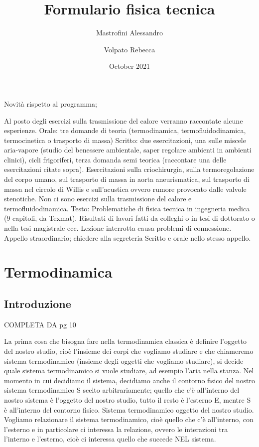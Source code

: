 \documentclass[a4paper]{article}
\title{Formulario fisica tecnica}
\author{
	Mastrofini Alessandro\\
	\and
	Volpato Rebecca\\
}
\date{October 2021}
\numberwithin{equation}{section}%
\begin{document}
\newpage
\maketitle
\newpage
\tableofcontents
\newpage	

\newpage 

Novità rispetto al programma;

Al posto degli esercizi sulla trasmissione del calore verranno raccontate alcune esperienze.
Orale: tre domande di teoria (termodinamica, termofluidodinamica, termocinetica o trasporto di massa) Scritto: due esercitazioni, una sulle miscele aria-vapore (studio del benessere ambientale, saper regolare ambienti in ambienti clinici), cicli frigoriferi, terza domanda semi teorica (raccontare una delle esercitazioni citate sopra). 
Esercitazioni sulla criochirurgia, sulla termoregolazione del corpo umano, sul trasporto di massa in aorta aneurismatica, sul trasporto di massa nel circolo di Willis e sull’acustica ovvero rumore provocato dalle valvole stenotiche. Non ci sono esercizi sulla trasmissione del calore e termofluidodinamica.
Testo: Problematiche di fisica tecnica in ingegneria medica (9 capitoli, da Texmat). Risultati di lavori fatti da colleghi o in tesi di dottorato o nella tesi magistrale ecc.
Lezione interrotta causa problemi di connessione. Appello straordinario; chiedere alla segreteria Scritto e orale nello stesso appello.

\newpage 


\section{Termodinamica}
\subsection{Introduzione}
	
COMPLETA DA pg 10 


La prima cosa che bisogna fare nella termodinamica classica è definire l’oggetto del nostro studio, cioè l’insieme dei corpi che vogliamo studiare e che chiameremo sistema termodinamico (insieme degli oggetti che vogliamo studiare), si decide quale sistema termodinamico si vuole studiare, ad esempio l’aria nella stanza.
Nel momento in cui decidiamo il sistema, decidiamo anche il contorno fisico del nostro sistema termodinamico S scelto arbitrariamente; quello che c’è all’interno del nostro sistema è l’oggetto del nostro studio, tutto il resto è l’esterno E, mentre S è all’interno del contorno fisico.
Sistema termodinamico   oggetto del nostro studio.
Vogliamo relazionare il sistema termodinamico, cioè quello che c’è all’interno, con l’esterno e in particolare ci interessa la relazione, ovvero le interazioni tra l’interno e l’esterno, cioè ci interessa quello che succede NEL sistema.
\end{document}
